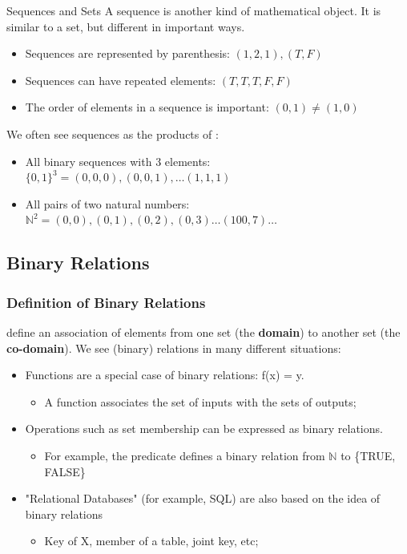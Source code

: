 \begin{frame}[t]{Sequences and Sets}
  A \alert{sequence} is another kind of mathematical object. It is similar to a set, but \alert{different in important ways.}\bigskip 

  \begin{itemize}
  \item Sequences are represented by parenthesis: $(1, 2, 1), (T, F)$
  \item Sequences can have repeated elements: $(T, T, T, F, F)$
  \item The order of elements in a sequence is important: $(0, 1) \neq (1, 0)$
  \end{itemize}\bigskip 

  We often see sequences as the products of :\bigskip

  \begin{itemize}
    \item All binary sequences with 3 elements: $\{0,1\}^3 = (0, 0, 0), (0, 0, 1), \ldots (1, 1, 1)$
    \item All pairs of two natural numbers: $\mathbb{N}^2 = (0, 0), (0, 1), (0, 2), (0, 3) \ldots (100, 7) \ldots$
  \end{itemize}
\end{frame}


\subsection{Binary Relations}
\begin{frame}
  \frametitle{Definition of Binary Relations}
   define an association of elements from one set (the {\bf domain}) to another set (the {\bf co-domain}). We see (binary) relations in many different situations:\bigskip

  \begin{itemize}
    \item Functions are a special case of binary relations: f(x) = y.
    \begin{itemize}
      \item A function associates the set of inputs with the sets of outputs;
    \end{itemize}\bigskip

    \item Operations such as set membership can be expressed as binary relations.
    \begin{itemize}
      \item For example, the predicate  defines a binary relation from $\mathbb{N}$ to \{TRUE, FALSE\}
    \end{itemize}\bigskip

    \item "Relational Databases" (for example, SQL) are also based on the idea of binary relations
    \begin{itemize}
      \item Key of X, member of a table, joint key, etc;
    \end{itemize}
    \end{itemize}
\end{frame}

